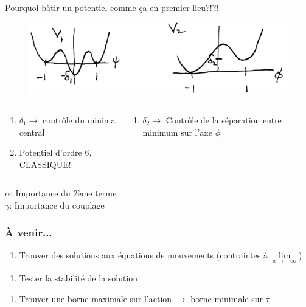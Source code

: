 \documentclass[handout]{beamer}
\begin{document}
\begin{frame}
Pourquoi bâtir un potentiel comme ça en premier lieu?!?!\\
\begin{figure}[0.3\textwidth]
    \includegraphics[scale=0.25]{psi_phi.png}
    \end{figure}
\begin{columns}[T]
    \begin{column}[T]{.5\linewidth}
    \begin{enumerate}
    \item $\delta_1 \rightarrow$ contrôle du minima central
    \item Potentiel d'ordre 6, CLASSIQUE! 
    \end{enumerate}
   
    \end{column}
    \begin{column}[T]{.5\linewidth}
    \begin{enumerate}
    \item    $\delta_2 \rightarrow$ Contrôle de la séparation entre minimum sur l'axe $\phi$
    \end{enumerate}

    \end{column}
  \end{columns}
  
 $\alpha$: Importance du 2ème terme \\
 $\gamma$: Importance du couplage \\
\end{frame}

\begin{frame}\frametitle{À venir...}
\begin{enumerate}
\item Trouver des solutions aux équations de mouvements (contraintes à $\lim\limits_{x \to \pm\infty}$)
\end{enumerate}
\begin{figure}[0.3\textwidth]
    \end{figure}
\begin{enumerate}
    \item Tester la stabilité de la solution
    \end{enumerate} 
    
\begin{figure}[0.3\textwidth]
    \end{figure}
    
\begin{enumerate}
   \item Trouver une borne maximale sur l'action $\rightarrow$ borne minimale sur $\tau$
   \end{enumerate}   
    
\end{frame}
\end{document}
